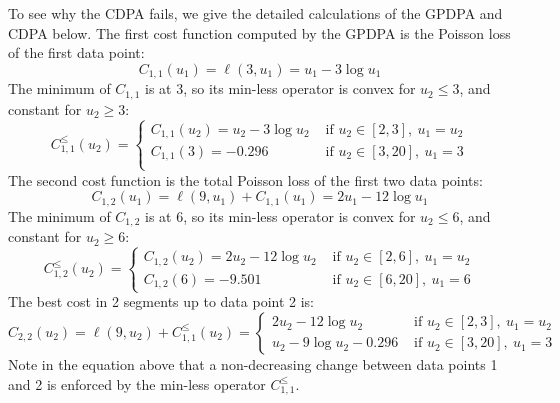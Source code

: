 \documentclass{article}
\begin{document}
To see why the CDPA fails, we give the detailed calculations of the
GPDPA and CDPA below. The first cost function computed by the GPDPA is
the Poisson loss of the first data point:
\begin{equation}
  C_{1,1}(u_1)=\ell(3, u_1) = u_1 -3\log u_1
\end{equation}
The minimum of $C_{1,1}$ is at 3, so its min-less operator is
convex for $u_2\leq 3$, and constant for $u_2\geq 3$:
\begin{equation}
    C^\leq_{1,1}(u_2) =
  \begin{cases}
    C_{1,1}(u_2) = u_2 -3\log u_2 & \text{ if } u_2 \in [2,3],\  u_1=u_2\\
    C_{1,1}(3) = -0.296 & \text{ if } u_2 \in [3,20],\  u_1=3\\
  \end{cases}
\end{equation}
The second cost function is the total Poisson loss of the first two
data points:
\begin{equation}
    C_{1,2}(u_1)=\ell(9, u_1)+C_{1,1}(u_1)=2u_1 -12\log u_1
\end{equation}
The minimum of $C_{1,2}$ is at 6, so its min-less operator is
convex for $u_2\leq 6$, and constant for $u_2\geq 6$:
\begin{equation}
    C^\leq_{1,2}(u_2)=
                     \begin{cases}
                       C_{1,2}(u_2)=2u_2 -12\log u_2 & \text{ if } u_2 \in[2, 6],\ u_1=u_2\\
                       C_{1,2}(6)=-9.501 &\text{ if } u_2\in [6,20],\ u_1=6
                     \end{cases}
\end{equation}
The best cost in 2 segments up to data point 2 is:
\begin{equation}
    C_{2,2}(u_2)=\ell(9, u_2) + C^\leq_{1,1}(u_2)   =
  \begin{cases}
    2u_2 -12\log u_2 & \text{ if } u_2 \in [2,3],\ u_1=u_2\\
    u_2 - 9\log u_2 -0.296 & \text{ if } u_2 \in [3, 20],\ u_1=3
  \end{cases}
\end{equation}
Note in the equation above that a non-decreasing change between data points 1 and 2 is enforced by the min-less operator $C_{1,1}^\leq$.
\end{document}
